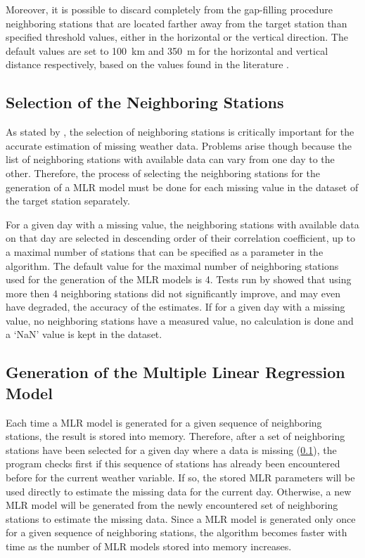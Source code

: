 \documentclass[TechnicalNoteMeteo.tex]{subfiles}
\begin{document}
Moreover, it is possible to discard completely from the gap-filling procedure neighboring stations that are located farther away from the target station than specified threshold values, either in the horizontal or the vertical direction. The default values are set to \SI{100}{km} and \SI{350}{m} for the horizontal and vertical distance respectively, based on the values found in the literature \citep{tronci_comparison_1986,xia_forest_1999,simolo_improving_2010}.

\subsection{Selection of the Neighboring Stations}\label{sec:select_stations}

As stated by \cite{eischeid_creating_2000}, the selection of neighboring stations is critically important for the accurate estimation of missing weather data. Problems arise though because the list of neighboring stations with available data can vary from one day to the other. Therefore, the process of selecting the neighboring stations for the generation of a MLR model must be done for each missing value in the dataset of the target station separately. 

For a given day with a missing value, the neighboring stations with available data on that day are selected in descending order of their correlation coefficient, up to a maximal number of stations that can be specified as a parameter in the algorithm. The default value for the maximal number of neighboring stations used for the generation of the MLR models is 4. Tests run by \cite{eischeid_creating_2000} showed that using more then 4 neighboring stations did not significantly improve, and may even have degraded, the accuracy of the estimates. If for a given day with a missing value, no neighboring stations have a measured value, no calculation is done and a ‘NaN' value is kept in the dataset. 

\subsection{Generation of the Multiple Linear Regression Model}\label{subsec:MLR_gen}

Each time a MLR model is generated for a given sequence of neighboring stations, the result is stored into memory. Therefore, after a set of neighboring stations have been selected for a given day where a data is missing (\cref{sec:select_stations}), the program checks first if this sequence of stations has already been encountered before for the current weather variable. If so, the stored MLR parameters will be used directly to estimate the missing data for the current day. Otherwise, a new MLR model will be generated from the newly encountered set of neighboring stations to estimate the missing data. Since a MLR model is generated only once for a given sequence of neighboring stations, the algorithm becomes faster with time as the number of MLR models stored into memory increases.
\end{document}
